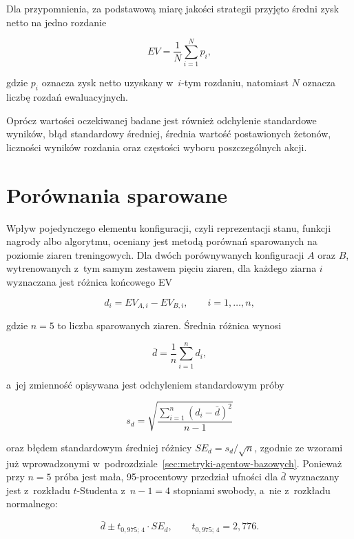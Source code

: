 Dla przypomnienia, za podstawową miarę jakości strategii przyjęto średni zysk netto na jedno
rozdanie

\begin{equation}
EV =
\frac{1}{N}
\sum_{i=1}^{N} p_i,
\end{equation}

gdzie $p_i$ oznacza zysk netto uzyskany w~$i$-tym rozdaniu, natomiast
$N$ oznacza liczbę rozdań ewaluacyjnych.

Oprócz wartości oczekiwanej badane jest również odchylenie standardowe
wyników, błąd standardowy średniej, średnia wartość postawionych
żetonów, liczności wyników rozdania oraz częstości wyboru
poszczególnych akcji.

\section{Porównania sparowane}
\label{sec:porownania-sparowane}

Wpływ pojedynczego elementu konfiguracji, czyli reprezentacji stanu,
funkcji nagrody albo algorytmu, oceniany jest metodą porównań sparowanych na
poziomie ziaren treningowych. Dla dwóch porównywanych konfiguracji $A$
oraz $B$, wytrenowanych z~tym samym zestawem pięciu ziaren, dla
każdego ziarna $i$ wyznaczana jest różnica końcowego EV

\begin{equation}
d_i = EV_{A,i} - EV_{B,i}, \qquad i=1,\dots,n,
\end{equation}

gdzie $n=5$ to liczba sparowanych ziaren. Średnia różnica wynosi

\begin{equation}
\bar{d} =
\frac{1}{n}
\sum_{i=1}^{n} d_i,
\end{equation}

a~jej zmienność opisywana jest odchyleniem standardowym próby

\begin{equation}
s_d =
\sqrt{
\frac{\sum_{i=1}^{n} (d_i - \bar{d})^2}{n-1}
}
\end{equation}

oraz błędem standardowym średniej różnicy $SE_d = s_d / \sqrt{n}$, zgodnie
ze wzorami już wprowadzonymi w~podrozdziale~\ref{sec:metryki-agentow-bazowych}.
Ponieważ przy $n=5$ próba jest mała, 95-procentowy przedział ufności dla
$\bar{d}$ wyznaczany jest z~rozkładu $t$-Studenta z~$n-1=4$ stopniami swobody,
a~nie z~rozkładu normalnego:

\begin{equation}
\bar{d} \pm t_{0{,}975;\,4} \cdot SE_d,
\qquad t_{0{,}975;\,4} = 2{,}776.
\end{equation}

